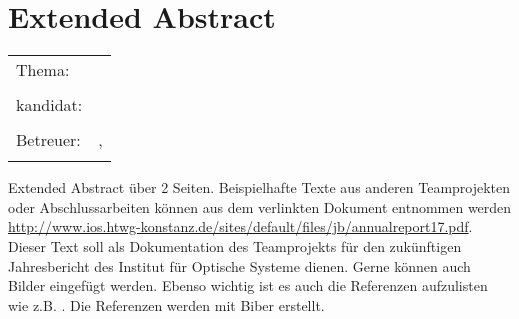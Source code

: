 \chapter*{Extended Abstract}

\begin{center}
	\begingroup
	\renewcommand*{\arraystretch}{1}
	{\makeatletter	
		\begin{tabular}{p{3.2cm}p{9.6cm}}
			Thema: & \thema \\
			& \\
			\type kandidat: & \verfasser \\
			& \\
			Betreuer: & \hochschule \newline \institut \newline \prueferA, \prueferB \\
			& \\
		\end{tabular}
		
		\makeatother}
	\endgroup
\end{center}

\bigskip

\noindent
Extended Abstract über 2 Seiten. Beispielhafte Texte aus anderen Teamprojekten oder Abschlussarbeiten können aus dem verlinkten Dokument entnommen werden \href{http://www.ios.htwg-konstanz.de/sites/default/files/jb/annualreport17.pdf}{http://www.ios.htwg-konstanz.de/sites/default/files/jb/annualreport17.pdf}.\\

\noindent Dieser Text soll als Dokumentation des Teamprojekts für den zukünftigen Jahresbericht des Institut für Optische Systeme dienen. Gerne können auch Bilder eingefügt werden. Ebenso wichtig ist es auch die Referenzen aufzulisten wie z.B. \cite{Geim2001}. Die Referenzen werden mit Biber erstellt.


\printbibliography[title={Referenzen}, heading=subbibliography]